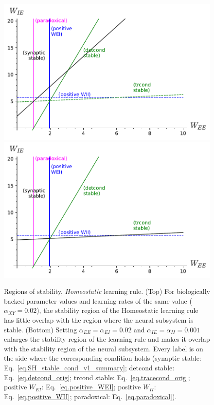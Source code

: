\documentclass[twocolumn]{article}
\newcommand{\EE}{\mathit{EE}}
\newcommand{\EI}{\mathit{EI}}
\newcommand{\IE}{\mathit{IE}}
\newcommand{\II}{\mathit{II}}
\newcommand{\XY}{\mathit{XY}}
\begin{document}
\begin{figure}[!ht]
\centering
\includegraphics[width=\linewidth]{SH_stability}
\includegraphics[width=\linewidth]{SH_stability_slowInh.pdf}
\caption{Regions of stability, {\em Homeostatic} learning rule. (Top) For biologically backed parameter values and learning rates of the same value ($\alpha_{\XY} = 0.02$), the stability region of the Homeostatic learning rule has little overlap with the region where the neural subsystem is stable. (Bottom) Setting $\alpha_{\EE}=\alpha_{\EI}=0.02$ and $\alpha_{\IE}=\alpha_{\II}=0.001$ enlarges the stability region of the learning rule and makes it overlap with the stability region of the neural subsystem.
Every label is on the side where the corresponding condition holds (synaptic stable: Eq.\ \ref{eq.SH_stable_cond_v1_summary}; detcond stable: Eq.\ \ref{eq.detcond_orig}; trcond stable: Eq.\ \ref{eq.tracecond_orig}; positive $W_{\EI}$: Eq.\ \ref{eq.positive_WEI}; positive $W_{\II}$: Eq.\ \ref{eq.positive_WII}; paradoxical: Eq.\ \ref{eq.paradoxical}).}
\label{fig.SH_stability}
\end{figure}
\end{document}
